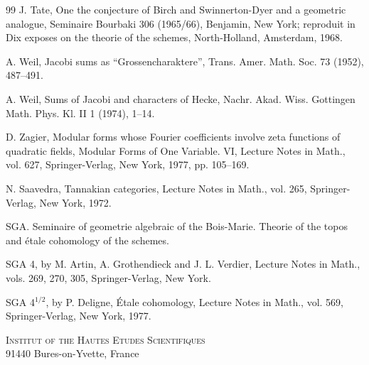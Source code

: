 \documentclass[12pt,a4paper]{article}
\theoremstyle{plain}
\theoremstyle{definition}
\theoremstyle{remark}
\begin{document}
\begin{thebibliography}{99}
J. Tate, One the conjecture of Birch and Swinnerton-Dyer and a geometric analogue, Seminaire
Bourbaki 306 (1965/66), Benjamin, New York; reproduit in Dix exposes on the theorie of the
schemes, North-Holland, Amsterdam, 1968.

A. Weil, Jacobi sums as ``Grossencharaktere'', Trans. Amer. Math. Soc. 73 (1952), 487--491.

A. Weil, Sums of Jacobi and characters of Hecke, Nachr. Akad. Wiss. Gottingen Math.
Phys. Kl. II 1 (1974), 1--14.

D. Zagier, Modular forms whose Fourier coefficients involve zeta functions of quadratic fields,
Modular Forms of One Variable. VI, Lecture Notes in Math., vol. 627, Springer-Verlag, New
York, 1977, pp. 105--169.

N. Saavedra, Tannakian categories, Lecture Notes in Math., vol. 265, Springer-Verlag,
New York, 1972.
\end{thebibliography}

\vspace{1em}
\noindent
SGA. Seminaire of geometrie algebraic of the Bois-Marie. Theorie of the topos and
étale cohomology of the schemes.

\noindent
SGA 4, by M. Artin, A. Grothendieck and J. L. Verdier, Lecture Notes in Math.,
vols. 269, 270, 305, Springer-Verlag, New York.

\noindent
SGA 4$^{1/2}$, by P. Deligne, Étale cohomology, Lecture Notes in Math., vol. 569,
Springer-Verlag, New York, 1977.

\vspace{2em}
\begin{flushright}
\textsc{Institut of the Hautes Etudes Scientifiques}\\
91440 Bures-on-Yvette, France
\end{flushright}
\end{document}
